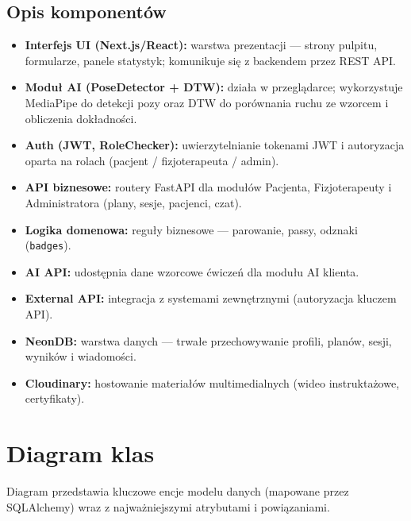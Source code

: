 \documentclass[11pt,a4paper]{article}
\begin{document}
\subsection{Opis komponentów}
\begin{itemize}
  \item \textbf{Interfejs UI (Next.js/React):} warstwa prezentacji — strony pulpitu, formularze, panele statystyk; komunikuje się z backendem przez REST API.
  \item \textbf{Moduł AI (PoseDetector + DTW):} działa w przeglądarce; wykorzystuje MediaPipe do detekcji pozy oraz DTW do porównania ruchu ze wzorcem i obliczenia dokładności.
  \item \textbf{Auth (JWT, RoleChecker):} uwierzytelnianie tokenami JWT i autoryzacja oparta na rolach (pacjent / fizjoterapeuta / admin).
  \item \textbf{API biznesowe:} routery FastAPI dla modułów Pacjenta, Fizjoterapeuty i Administratora (plany, sesje, pacjenci, czat).
  \item \textbf{Logika domenowa:} reguły biznesowe — parowanie, passy, odznaki (\texttt{badges}).
  \item \textbf{AI API:} udostępnia dane wzorcowe ćwiczeń dla modułu AI klienta.
  \item \textbf{External API:} integracja z systemami zewnętrznymi (autoryzacja kluczem API).
  \item \textbf{NeonDB:} warstwa danych — trwałe przechowywanie profili, planów, sesji, wyników i wiadomości.
  \item \textbf{Cloudinary:} hostowanie materiałów multimedialnych (wideo instruktażowe, certyfikaty).
\end{itemize}

\FloatBarrier
\section{Diagram klas}
Diagram przedstawia kluczowe encje modelu danych (mapowane przez SQLAlchemy) wraz z najważniejszymi atrybutami i powiązaniami.
\end{document}
